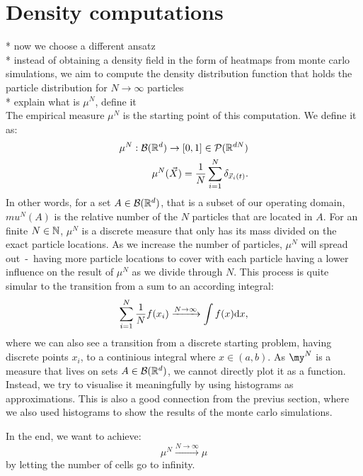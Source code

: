 \section{Density computations}
* now we choose a different ansatz \\
* instead of obtaining a density field in the form of heatmaps from monte carlo simulations, we aim to compute the density distribution function that holds the particle distribution for $N \rightarrow \infty$ particles \\
* explain what is $\mu^N$, define it \\
The empirical measure $\mu^N$ is the starting point of this computation. 
We define it as:  
\begin{align*}
    \mu^{N}: \mathcal{B}(\mathbb{R}^d) \rightarrow [0,1] \in \mathcal{P}(\mathbb{R}^{dN}) \\
    \mu^{N}(\vec{X}) = \frac{1}{N} \sum\limits_{i=1}^{N} \delta_{\vec{x}_i(t)}.
\end{align*}
In other words, for a set $A \in \mathcal{B}(\mathbb{R}^d)$, that is a subset of our operating domain, $mu^{N}(A)$ is the relative number of the $N$ particles that are located in $A$. 
For an finite $N \in \mathbb{N}$, $\mu^{N}$ is a discrete measure that only has its mass divided on the exact particle locations. 
As we increase the number of particles, $\mu^{N}$ will spread out \,-\, having more particle locations to cover with each particle having a lower influence on the result of $\mu^{N}$ as we divide through $N$.
This process is quite simular to the transition from a sum to an according integral:
\[ \sum\limits_{i=1}^{N} \frac{1}{N} f(x_i) \xrightarrow{N \to \infty} \int f(x) \mathrm{d} x,  \]
where we can also see a transition from a discrete starting problem, having discrete points ${x_i}$, to a continious integral where $x \in (a,b)$. 
As $\my^N$ is a measure that lives on sets $A \in \mathcal{B}(\mathbb{R}^d)$, we cannot directly plot it as a function. 
Instead, we try to visualise it meaningfully by using histograms as approximations.
This is also a good connection from the previus section, where we also used histograms to show the results of the monte carlo simulations. 
  





In the end, we want to achieve:
\[ \mu^N \xrightarrow{N \to \infty} \mu\]
by letting the number of cells go to infinity. \\

